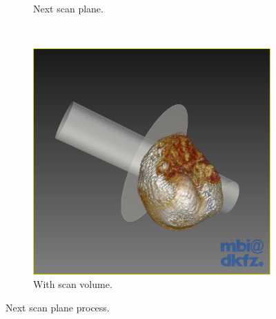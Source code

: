 \begin{figure}[H]
\begin{subfigure}[b]{0.32\textwidth}
    \caption*{Next scan plane.}
    \label{fig:nextscanplane1}
  \end{subfigure}%
  ~ %
  \begin{subfigure}[b]{0.32\textwidth}
    \includegraphics[width=\textwidth]{images/next_scan_plane/next_scan_plane_2.png}
    \caption*{With scan volume.}
    \label{fig:nextscanplane2}  
  \end{subfigure}
  \caption{Next scan plane process.}\label{fig:nextscanplane}
\end{figure}